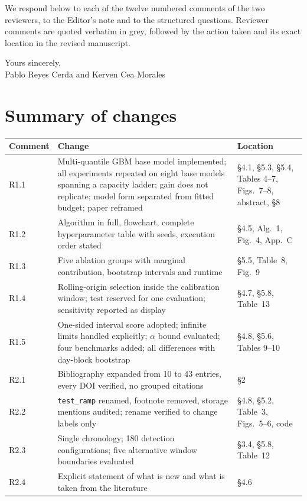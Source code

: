 \documentclass[11pt,a4paper]{article}
\begin{document}
We respond below to each of the twelve numbered comments of the two reviewers, to the Editor's note and to the structured questions. Reviewer comments are quoted verbatim in grey, followed by the action taken and its exact location in the revised manuscript.

\bigskip
Yours sincerely,\\
Pablo Reyes Cerda and Kerven Cea Morales

\newpage
\section*{Summary of changes}

\begin{tabular}{@{}p{}p{}p{}@{}}
\toprule
Comment & Change & Location \\
\midrule
R1.1 & Multi-quantile GBM base model implemented; all experiments repeated on eight base models spanning a capacity ladder; gain does not replicate; model form separated from fitted budget; paper reframed & \S4.1, \S5.3, \S5.4, Tables 4--7, Figs.~7--8, abstract, \S8 \\
R1.2 & Algorithm in full, flowchart, complete hyperparameter table with seeds, execution order stated & \S4.5, Alg.~1, Fig.~4, App.~C \\
R1.3 & Five ablation groups with marginal contribution, bootstrap intervals and runtime & \S5.5, Table~8, Fig.~9 \\
R1.4 & Rolling-origin selection inside the calibration window; test reserved for one evaluation; sensitivity reported as display & \S4.7, \S5.8, Table~13 \\
R1.5 & One-sided interval score adopted; infinite limits handled explicitly; $\alpha$ bound evaluated; four benchmarks added; all differences with day-block bootstrap & \S4.8, \S5.6, Tables 9--10 \\
R2.1 & Bibliography expanded from 10 to 43 entries, every DOI verified, no grouped citations & \S2 \\
R2.2 & \texttt{test\_ramp} renamed, footnote removed, storage mentions audited; rename verified to change labels only & \S4.8, \S5.2, Table~3, Figs.~5--6, code \\
R2.3 & Single chronology; 180 detection configurations; five alternative window boundaries evaluated & \S3.4, \S5.8, Table~12 \\
R2.4 & Explicit statement of what is new and what is taken from the literature & \S4.6 \\

\end{tabular}
\end{document}
